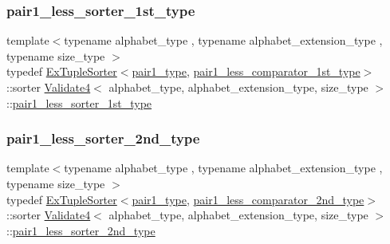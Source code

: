 \subsubsection{\texorpdfstring{pair1\+\_\+less\+\_\+sorter\+\_\+1st\+\_\+type}{pair1\_less\_sorter\_1st\_type}}
{\footnotesize\ttfamily template$<$typename alphabet\+\_\+type , typename alphabet\+\_\+extension\+\_\+type , typename size\+\_\+type $>$ \\
typedef \hyperlink{struct_ex_tuple_sorter}{Ex\+Tuple\+Sorter}$<$\hyperlink{class_validate4_aaa2fcb80a05115eb4ca02ab23df8827e}{pair1\+\_\+type}, \hyperlink{class_validate4_af01005bf9ba711e95fc52fc41e323716}{pair1\+\_\+less\+\_\+comparator\+\_\+1st\+\_\+type}$>$\+::sorter \hyperlink{class_validate4}{Validate4}$<$ alphabet\+\_\+type, alphabet\+\_\+extension\+\_\+type, size\+\_\+type $>$\+::\hyperlink{class_validate4_a40b1f73557cfa4c0b26f56f5038a4c5c}{pair1\+\_\+less\+\_\+sorter\+\_\+1st\+\_\+type}\hspace{0.3cm}{\ttfamily [private]}}

\mbox{\label{class_validate4_a65355c8a8ccca4870060305479e7748c}} 
\subsubsection{\texorpdfstring{pair1\+\_\+less\+\_\+sorter\+\_\+2nd\+\_\+type}{pair1\_less\_sorter\_2nd\_type}}
{\footnotesize\ttfamily template$<$typename alphabet\+\_\+type , typename alphabet\+\_\+extension\+\_\+type , typename size\+\_\+type $>$ \\
typedef \hyperlink{struct_ex_tuple_sorter}{Ex\+Tuple\+Sorter}$<$\hyperlink{class_validate4_aaa2fcb80a05115eb4ca02ab23df8827e}{pair1\+\_\+type}, \hyperlink{class_validate4_a67166f1b6f64e5d8887d9a5aa6072346}{pair1\+\_\+less\+\_\+comparator\+\_\+2nd\+\_\+type}$>$\+::sorter \hyperlink{class_validate4}{Validate4}$<$ alphabet\+\_\+type, alphabet\+\_\+extension\+\_\+type, size\+\_\+type $>$\+::\hyperlink{class_validate4_a65355c8a8ccca4870060305479e7748c}{pair1\+\_\+less\+\_\+sorter\+\_\+2nd\+\_\+type}\hspace{0.3cm}{\ttfamily [private]}}

\mbox{\label{class_validate4_aaa2fcb80a05115eb4ca02ab23df8827e}} 
